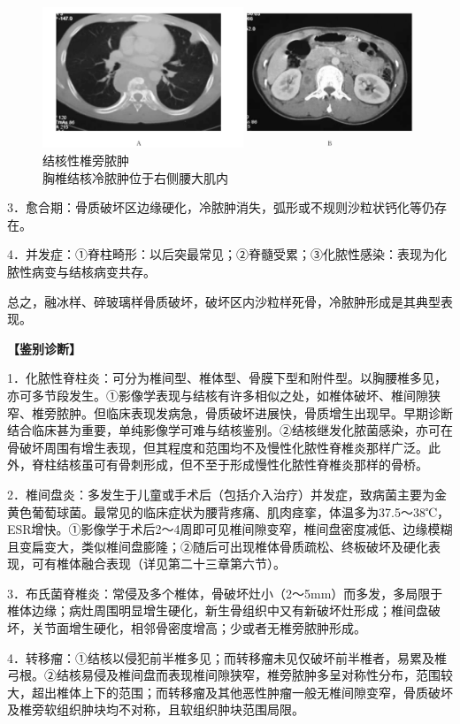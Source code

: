 \begin{figure}[!htbp]
 \centering
 \includegraphics[width=.7\textwidth,height=\textheight,keepaspectratio]{./images/Image00432.jpg}
 \captionsetup{justification=centering}
 \caption{结核性椎旁脓肿\\{\small 胸椎结核冷脓肿位于右侧腰大肌内}}
 \label{fig22-15}
  \end{figure} 

3．愈合期：骨质破坏区边缘硬化，冷脓肿消失，弧形或不规则沙粒状钙化等仍存在。

4．并发症：①脊柱畸形：以后突最常见；②脊髓受累；③化脓性感染：表现为化脓性病变与结核病变共存。

总之，融冰样、碎玻璃样骨质破坏，破坏区内沙粒样死骨，冷脓肿形成是其典型表现。

\textbf{【鉴别诊断】}

1．化脓性脊柱炎：可分为椎间型、椎体型、骨膜下型和附件型。以胸腰椎多见，亦可多节段发生。①影像学表现与结核有许多相似之处，如椎体破坏、椎间隙狭窄、椎旁脓肿。但临床表现发病急，骨质破坏进展快，骨质增生出现早。早期诊断结合临床甚为重要，单纯影像学可难与结核鉴别。②结核继发化脓菌感染，亦可在骨破坏周围有增生表现，但其程度和范围均不及慢性化脓性脊椎炎那样广泛。此外，脊柱结核虽可有骨刺形成，但不至于形成慢性化脓性脊椎炎那样的骨桥。

2．椎间盘炎：多发生于儿童或手术后（包括介入治疗）并发症，致病菌主要为金黄色葡萄球菌。最常见的临床症状为腰背疼痛、肌肉痉挛，体温多为37.5～38℃，ESR增快。①影像学于术后2～4周即可见椎间隙变窄，椎间盘密度减低、边缘模糊且变扁变大，类似椎间盘膨隆；②随后可出现椎体骨质疏松、终板破坏及硬化表现，可有椎体融合表现（详见第二十三章第六节）。

3．布氏菌脊椎炎：常侵及多个椎体，骨破坏灶小（2～5mm）而多发，多局限于椎体边缘；病灶周围明显增生硬化，新生骨组织中又有新破坏灶形成；椎间盘破坏，关节面增生硬化，相邻骨密度增高；少或者无椎旁脓肿形成。

4．转移瘤：①结核以侵犯前半椎多见；而转移瘤未见仅破坏前半椎者，易累及椎弓根。②结核易侵及椎间盘而表现椎间隙狭窄，椎旁脓肿多呈对称性分布，范围较大，超出椎体上下的范围；而转移瘤及其他恶性肿瘤一般无椎间隙变窄，骨质破坏及椎旁软组织肿块均不对称，且软组织肿块范围局限。

